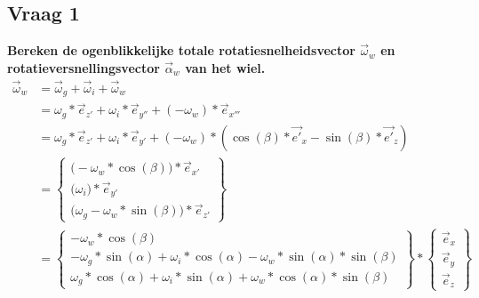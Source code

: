 \documentclass[a4paper,10pt]{article}
\begin{document}
\subsection{Vraag 1}
\textbf{Bereken de ogenblikkelijke totale rotatiesnelheidsvector $\vec{\omega}_{w}$ en rotatieversnellingsvector $\vec{\alpha}_{w}$ van het wiel.}\\


\begin{equation} 
\begin{aligned}
	\vec{\omega}_{w} &= \vec{\omega}_{g} + \vec{\omega}_{i} + \vec{\omega}_{w} \\
	& = {\omega}_g * \vec{e}_{z'} + {\omega}_i * \vec{e}_{y''} +(-{\omega}_w)*\vec{e}_{x'''}\\
	& =  {\omega}_g * \vec{e}_{z'} + {\omega}_i * \vec{e}_{y'} +(-{\omega}_w)*(\cos(\beta)*\vec{e'}_{x}-\sin(\beta)*\vec{e'}_{z})\\
	&=\begin{Bmatrix}
	\Big(-\omega_w*\cos(\beta)\Big)*\vec{e}_{x'} \\
	\Big(\omega_i\Big)*\vec{e}_{y'}\\
	\Big(\omega_g-\omega_w*\sin(\beta)\Big)*\vec{e}_{z'}
	\end{Bmatrix}\\
	& = \begin{Bmatrix}
	- {\omega}_{w} * \cos(\beta) \\
	- {\omega}_{g} * \sin(\alpha) + {\omega}_{i} * \cos(\alpha) - {\omega}_{w} * \sin(\alpha)*\sin(\beta) \\
	{\omega}_{g} * \cos(\alpha) + {\omega}_{i} * \sin(\alpha) + {\omega}_{w} * \cos(\alpha)*\sin(\beta) 
	\end{Bmatrix}  * \begin{Bmatrix}
	\vec{e}_x \\
	\vec{e}_y\\
	\vec{e}_z
	\end{Bmatrix}
\end{aligned}
\end{equation}\\
\end{document}
